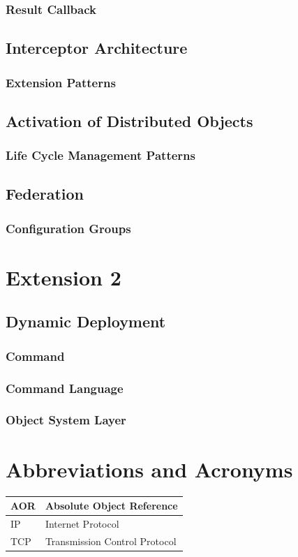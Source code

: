 \documentclass[a4paper]{article}
\begin{document}
\subsubsection{Result Callback}

\subsection{Interceptor Architecture}
\subsubsection{Extension Patterns}

\subsection{Activation of Distributed Objects}
\subsubsection{Life Cycle Management Patterns}

\subsection{Federation}
\subsubsection{Configuration Groups}

\section{Extension 2}
\subsection{Dynamic Deployment}
\subsubsection{Command}
\subsubsection{Command Language}
\subsubsection{Object System Layer}

\section{Abbreviations and Acronyms}

	\begin{tabular}{|l|l|}
	\hline
	AOR & Absolute Object Reference\\
	\hline
	IP & Internet Protocol\\
	\hline
	TCP & Transmission Control Protocol\\
	\hline
	\end{tabular}

\newpage


\end{document}
